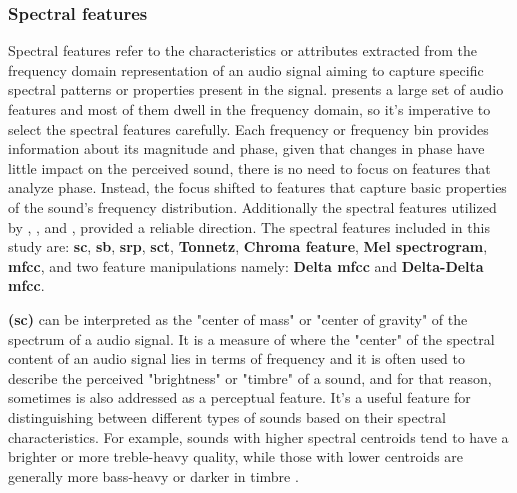 


\subsubsection{Spectral features}
\label{subsubsec:spectral_fatures}

Spectral features refer to the characteristics or attributes extracted from the frequency domain representation of an audio signal aiming to capture specific spectral patterns or properties present in the signal. \textcite{Peeters2004} presents a large set of audio features and most of them dwell in the frequency domain, so it's imperative to select the spectral features carefully. Each frequency or frequency bin provides information about its magnitude and phase, given that changes in phase have little impact on the perceived sound, there is no need to focus on features that analyze phase. Instead, the focus shifted to features that capture basic properties of the sound's frequency distribution. Additionally the spectral features utilized by \textcite{Lhoest2021}, \textcite{Silva2019}, and \textcite{Bountourakis2015}, provided a reliable direction. The spectral features included in this study are: \textbf{\gls{sc}}, \textbf{\gls{sb}}, \textbf{\gls{srp}}, \textbf{\gls{sct}}, \textbf{Tonnetz}, \textbf{Chroma feature}, \textbf{Mel spectrogram}, \textbf{\gls{mfcc}}, and two feature manipulations namely: \textbf{Delta \gls{mfcc}} and \textbf{Delta-Delta \gls{mfcc}}.


\textbf{ (\gls{sc})} can be interpreted as the "center of mass" or "center of gravity" of the spectrum of a audio signal. It is a measure of where the "center" of the spectral content of an audio signal lies in terms of frequency and it is often used to describe the perceived "brightness" or "timbre" of a sound, and for that reason, sometimes is also addressed as a perceptual feature. It's a useful feature for distinguishing between different types of sounds based on their spectral characteristics. %
For example, sounds with higher spectral centroids tend to have a brighter or more treble-heavy quality, while those with lower centroids are generally more bass-heavy or darker in timbre \cite{Park2008}.

